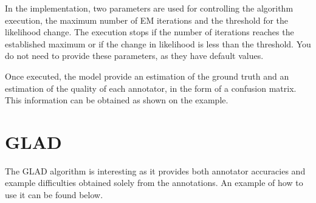 \documentclass[letterpaper,10pt,english]{sphinxmanual}
\begin{document}
%
\begin{sphinxVerbatim}[commandchars=\\\{\}]
 
 

   

   \PYG{o}{[}\PYG{o}{]}

     

   \PYG{o}{[}\PYG{o}{]}

   
\end{sphinxVerbatim}

In the implementation, two parameters are used for controlling the algorithm execution, the maximum number
of EM iterations and the threshold for the likelihood change. The execution stops if the number of iterations reaches 
the established maximum or if the change in likelihood is less than the threshold. You do not need to
provide these parameters, as they have default values.

Once executed, the model provide an estimation of the ground truth
and an estimation of the quality of each annotator, in the form of a confusion matrix. This information can be obtained 
as shown on the example.


\section{GLAD}
\label{\detokenize{usage/examples:glad}}
The GLAD algorithm is interesting as it provides both annotator accuracies and example difficulties obtained
solely from the annotations. An example of how to use it can be found below.
\end{document}
